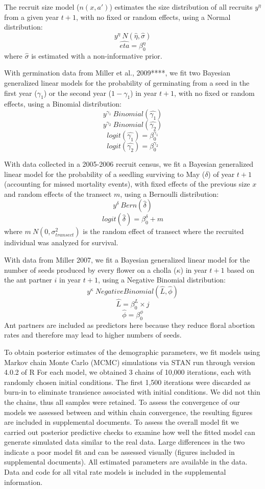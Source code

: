 \documentclass[11pt]{article}
\begin{document}
The recruit size model ($n(x,a')$) estimates the size distribution of all recruits $y^{\eta}$ from a given year $t+1$, with no fixed or random effects, using a Normal distribution: 
$$y^{\eta} ~ N(\hat{\eta},\hat{\sigma})$$
$$\hat{eta} = \beta_{0}^{\eta}$$
where $\hat{\sigma}$ is estimated with a non-informative prior. 

With germination data from Miller et al., 2009****, we fit two Bayesian generalized linear models for the probability of germinating from a seed in the first year ($\gamma_1$) or the second year ($1 - \gamma_1$) in year $t+1$, with no fixed or random effects, using a Binomial distribution:
$$y^{\gamma_1} ~ Binomial(\hat{\gamma_1})$$
$$y^{\gamma_2} ~ Binomial(\hat{\gamma_2})$$
$$logit(\hat{\gamma_1}) = \beta_{0}^{\gamma_1}$$
$$logit(\hat{\gamma_2}) = \beta_{0}^{\gamma_2}$$

With data collected in a 2005-2006 recruit census, we fit a Bayesian generalized linear model for the probability of a seedling surviving to May ($\delta$) of year $t+1$ (accounting for missed mortality events), with fixed effects of the previous size $x$ and random effects of the transect $m$, using a Bernoulli distribution: 
$$y^{\delta} ~ Bern(\hat{\delta})$$
$$logit(\hat{\delta}) = \beta_{0}^{\delta} + m$$
 where $m ~ N(0, \sigma_{transect}^2)$ is the random effect of transect where the recruited individual was analyzed for survival.

With data from Miller 2007, we fit a Bayesian generalized linear model for the number of seeds produced by every flower on a cholla ($\kappa$) in year $t+1$ based on the ant partner $i$ in year $t+1$, using a Negative Binomial distribution:
$$y^{\kappa} ~ Negative Binomial(\hat{L},\hat{\phi})$$
$$\hat{L} = \beta_{0}^{L} \times j$$
$$\hat{\phi} = \beta_{0}^{\phi}$$
Ant partners are included as predictors here because they reduce floral abortion rates and therefore may lead to higher numbers of seeds. 

To obtain posterior estimates of the demographic parameters, we fit models using Markov chain Monte Carlo (MCMC) simulations via STAN run through version 4.0.2 of R %
For each model, we obtained 3 chains of 10,000 iterations, each with randomly chosen initial conditions. 
The first 1,500 iterations were discarded as burn-in to eliminate transience associated with initial conditions. 
We did not thin the chains, thus all samples were retained. 
To assess the convergence of our models we assessed between and within chain convergence, the resulting figures are included in supplemental documents. 
To assess the overall model fit we carried out posterior predictive checks to examine how well the fitted model can generate simulated data similar to the real data.
Large differences in the two indicate a poor model fit and can be assessed visually (figures included in supplemental documents). 
All estimated parameters are available in the data. 
Data and code for all vital rate models is included in the supplemental information.
\end{document}
